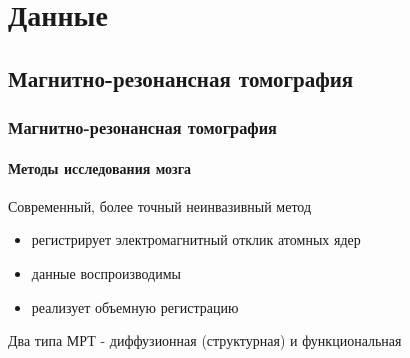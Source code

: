 \documentclass[xcolor=table]{beamer}
\begin{document}
    
      
\section[Данные]{Данные}

    \subsection[МРТ]{Магнитно-резонансная томография}
    \begin{frame}
    \frametitle{Магнитно-резонансная томография}
    \framesubtitle{Методы исследования мозга}
    Современный, более точный неинвазивный метод
    \begin{itemize}
        \item регистрирует электромагнитный отклик атомных ядер
        \item данные воспроизводимы
        \item реализует объемную регистрацию
    \end{itemize}
    Два типа МРТ - диффузионная (структурная) и функциональная
    \end{frame}
    
\end{document}
